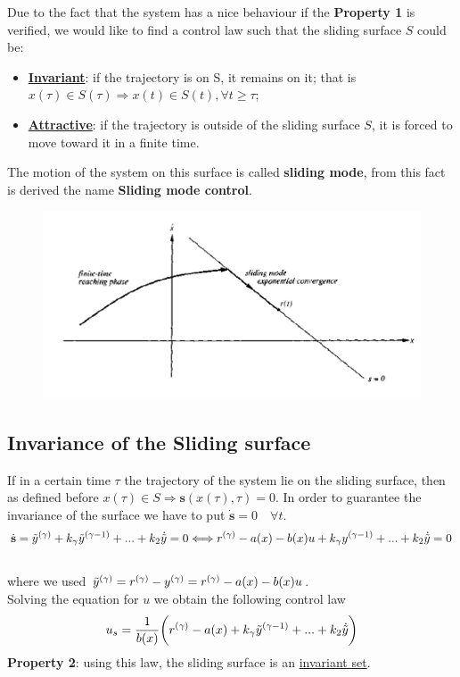 Due to the fact that the system has a nice behaviour if the \textbf{Property 1} is verified, we would like to find a control law such that the sliding surface $S$ could be: 
\begin{itemize}
    \item \textbf{\underline{Invariant}}: if the trajectory is on S, it remains on it; that is $x(\tau)\in S(\tau) \Rightarrow x(t)\in S(t), \forall t \ge \tau$; 
    \item \textbf{\underline{Attractive}}: if the trajectory is outside of the sliding surface $S$, it is forced to move toward it in a finite time.
\end{itemize}

The motion of the system on this surface is called \textbf{sliding mode}, from this fact is derived the name \textbf{Sliding mode control}.

\begin{figure}[h]
    \centering
    \includegraphics[scale=0.7]{NonLinearControl/images/SMC.png}
    \label{fig:enter-label}
\end{figure}

\subsection{Invariance of the Sliding surface}
If in a certain time $\tau$ the trajectory of the system lie on the sliding surface, then as defined before $x(\tau)\in S \Rightarrow \textbf{s}(x(\tau), \tau)=0$. In order to guarantee the invariance of the surface we have to put $\dot{\textbf{s}}=0 \quad \forall t$.\\
\begin{align*}
&\dot{\textbf{s}}=\Tilde{y}^{(\gamma)}+k_\gamma \Tilde{y}^{(\gamma-1)}+...+k_2\dot{\Tilde{y}}=0 \Longleftrightarrow r^{(\gamma)}-a(x)-b(x)u+k_\gamma y^{(\gamma-1)}+...+k_2 \dot{\Tilde{y}}=0\\
    &
\end{align*}
where we used $\Tilde{y}^{(\gamma)}=r^{(\gamma)}-y^{(\gamma)}=
r^{(\gamma)}-a(x)-b(x)u$. \\
Solving the equation for $u$ we obtain the following control law
\begin{equation}
    u_s=\frac{1}{b(x)}\bigg(r^{(\gamma)}-a(x)+k_\gamma \Tilde{y}^{(\gamma-1)}+...+k_2 \dot{\Tilde{y}} \bigg)
\end{equation}
\noindent
{\color{red} \textbf{Property 2}}: using this law, the sliding surface is an \underline{invariant set}. 

